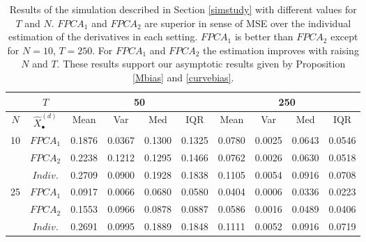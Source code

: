 \begin{table}
\footnotesize
  \centering
  \begin{tabular}{c|c|c|c|c|c|c|c|c|c}
    \hline
    \hline
    &$T$&\multicolumn{4}{c|}{50}&\multicolumn{4}{c}{250}\\
		\hline
    $N$&$\hat{X}^{(d)}_\bullet$&Mean&Var&Med&IQR&Mean&Var&Med&IQR\\
    \hline
    \multirow{3}{12pt}{10}	&\footnotesize $FPCA_1$& 0.1876 & 0.0367 &0.1300 &0.1325& 0.0780 & 0.0025 &0.0643&0.0546\\
													&\footnotesize $FPCA_2$  & 0.2238 & 0.1212 &0.1295 &0.1466& 0.0762 & 0.0026 &0.0630&0.0518\\
													&\footnotesize $Indiv.$  & 0.2709 & 0.0900 &0.1928 &0.1838& 0.1105 & 0.0054 &0.0916&0.0708\\
								\hline
    \multirow{3}{12pt}{25}&\footnotesize $FPCA_1$& 0.0917 & 0.0066 &0.0680&0.0580& 0.0404&0.0006 & 0.0336 &0.0223\\
													&\footnotesize $FPCA_2$& 0.1553 & 0.0966 &0.0878&0.0887& 0.0586&0.0016 & 0.0489 &0.0406\\
													&\footnotesize $Indiv.$& 0.2691 & 0.0995 &0.1889&0.1848& 0.1111&0.0052 & 0.0916 &0.0719\\
    \hline  \hline
  \end{tabular}
  \caption{Results of the simulation described in Section \ref{simstudy} with different values for $T$ and $N$. $FPCA_1$ and $FPCA_2$ are superior in sense of MSE over the individual estimation of the derivatives in each setting. $FPCA_1$ is better than $FPCA_2$ except for $N=10$, $T=250$. For $FPCA_1$ and $FPCA_2$ the estimation improves with raising $N$ and $T$. These results support our asymptotic results given by Proposition \ref{Mbias} and \ref{curvebias}. }
  \label{fig:SimuResults}
\end{table}


